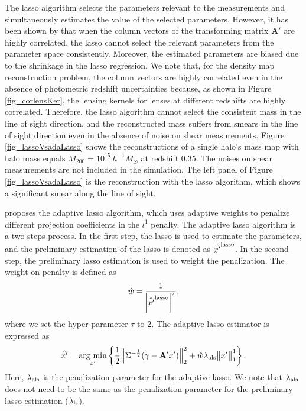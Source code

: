 \documentclass[twocolumn]{aastex62}
\newcommand{\argmin}{\mathop{\rm arg~min}\limits}
\begin{document}
The lasso algorithm selects the parameters relevant to the measurements and
simultaneously estimates the value of the selected parameters.  However, it has
been shown by \citet{AdaLASSO-Zou2006} that when the column vectors of the
transforming matrix $\mathbf{A'}$ are highly correlated, the lasso cannot
select the relevant parameters from the parameter space consistently.
Moreover, the estimated parameters are biased due to the shrinkage in the lasso
regression. We note that, for the density map reconstruction problem, the
column vectors are highly correlated even in the absence of photometric
redshift uncertainties because, as shown in Figure \ref{fig_corlensKer}, the
lensing kernels for lenses at different redshifts are highly correlated.
Therefore, the lasso algorithm cannot select the consistent mass in the line of
sight direction, and the reconstructed mass suffers from smears in the line of
sight direction even in the absence of noise on shear measurements.  Figure
\ref{fig_lassoVsadaLasso} shows the reconstructions of a single halo's mass map
with halo mass equals $M_{200}=10^{15} ~h^{-1}M_{\odot}$ at redshift $0.35$.
The noises on shear measurements are not included in the simulation.  The left
panel of Figure \ref{fig_lassoVsadaLasso} is the reconstruction with the lasso
algorithm, which shows a significant smear along the line of sight.

\citet{AdaLASSO-Zou2006} proposes the adaptive lasso algorithm, which uses
adaptive weights to penalize different projection coefficients in the $l^1$
penalty. The adaptive lasso algorithm is a two-steps process. In the first
step, the lasso is used to estimate the parameters, and the preliminary
estimation of the lasso is denoted as $\hat{x'}^{\rm{lasso}}$. In the second
step, the preliminary lasso estimation is used to weight the penalization. The
weight on penalty is defined as
\begin{equation}
\hat{w}= \frac{1}{\abs{\hat{x'}^{\rm{lasso}}}^\tau},
\end{equation}
where we set the hyper-parameter $\tau$ to $2$.  The adaptive lasso estimator is
expressed as
\begin{equation}\label{eq-lossFun}
\hat{x'}=\argmin_{x'} \left\{ \frac{1}{2} \norm{\Sigma^{-\frac{1}{2}}(\gamma-\mathbf{A'}x')}^2_2 +
\hat{w}\lambda_{\rm{als}} \norm{x'}^1_1\right\}.
\end{equation}
Here, $\lambda_{\rm{als}}$ is the penalization parameter for the adaptive
lasso.  We note that $\lambda_{\rm{als}}$ does not need to be the same as the
penalization parameter for the preliminary lasso estimation
($\lambda_{\rm{ls}}$).
\end{document}
